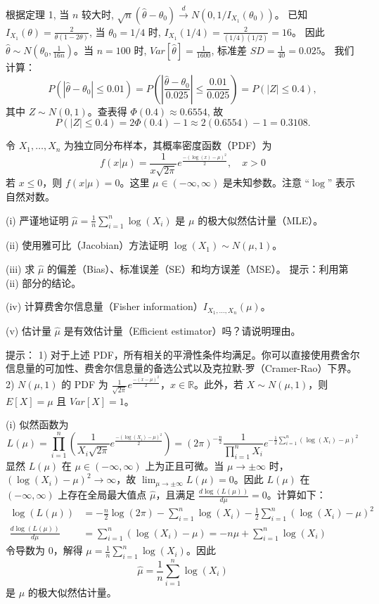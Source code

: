 \begin{questions}
\begin{parts}
\begin{solution}
根据定理 1, 当 $n$ 较大时, $\sqrt{n}(\hat{\theta} - \theta_0) \xrightarrow{d} N(0, 1/I_{X_1}(\theta_0))$。
已知 $I_{X_1}(\theta) = \frac{2}{\theta(1 - 2\theta)}$, 当 $\theta_0 = 1/4$ 时, $I_{X_1}(1/4) = \frac{2}{(1/4)(1/2)} = 16$。
因此 $\hat{\theta} \sim N(\theta_0, \frac{1}{16n})$。当 $n = 100$ 时, $Var[\hat{\theta}] = \frac{1}{1600}$, 标准差 $SD = \frac{1}{40} = 0.025$。
我们计算：
\[
P(|\hat{\theta} - \theta_0| \le 0.01) = P\left( \left| \frac{\hat{\theta} - \theta_0}{0.025} \right| \le \frac{0.01}{0.025} \right) = P(|Z| \le 0.4),
\]
其中 $Z \sim N(0, 1)$。查表得 $\Phi(0.4) \approx 0.6554$, 故
\[
P(|Z| \le 0.4) = 2\Phi(0.4) - 1 \approx 2(0.6554) - 1 = 0.3108.
\]
\end{solution}
\end{parts}

\question
令 $X_1, \ldots, X_n$ 为独立同分布样本，其概率密度函数（PDF）为
\[
f(x|\mu) = \frac{1}{x\sqrt{2\pi}} e^{\frac{-(\log(x)-\mu)^2}{2}}, \quad x > 0
\]
若 $x \le 0$，则 $f(x|\mu) = 0$。这里 $\mu \in (-\infty, \infty)$ 是未知参数。注意 “$\log$” 表示自然对数。

(i) 严谨地证明 $\hat{\mu} = \frac{1}{n} \sum_{i=1}^n \log(X_i)$ 是 $\mu$ 的极大似然估计量（MLE）。

(ii) 使用雅可比（Jacobian）方法证明 $\log(X_1) \sim N(\mu, 1)$。

(iii) 求 $\hat{\mu}$ 的偏差（Bias）、标准误差（SE）和均方误差（MSE）。
提示：利用第 (ii) 部分的结论。

(iv) 计算费舍尔信息量（Fisher information）$I_{X_1, \ldots, X_n}(\mu)$。

(v) 估计量 $\hat{\mu}$ 是有效估计量（Efficient estimator）吗？请说明理由。

提示：
1) 对于上述 PDF，所有相关的平滑性条件均满足。你可以直接使用费舍尔信息量的可加性、费舍尔信息量的备选公式以及克拉默-罗（Cramer-Rao）下界。
2) $N(\mu, 1)$ 的 PDF 为 $\frac{1}{\sqrt{2\pi}} e^{\frac{-(x-\mu)^2}{2}}$，$x \in \mathbb{R}$。此外，若 $X \sim N(\mu, 1)$，则 $E[X] = \mu$ 且 $Var[X] = 1$。

\begin{solution}
(i) 似然函数为
\[
L(\mu) = \prod_{i=1}^n \left( \frac{1}{X_i\sqrt{2\pi}} e^{\frac{-(\log(X_i)-\mu)^2}{2}} \right) = (2\pi)^{-\frac{n}{2}} \frac{1}{\prod_{i=1}^n X_i} e^{-\frac{1}{2} \sum_{i=1}^n (\log(X_i)-\mu)^2}
\]
显然 $L(\mu)$ 在 $\mu \in (-\infty, \infty)$ 上为正且可微。当 $\mu \to \pm \infty$ 时，$(\log(X_i)-\mu)^2 \to \infty$，故 $\lim_{\mu \to \pm \infty} L(\mu) = 0$。因此 $L(\mu)$ 在 $(-\infty, \infty)$ 上存在全局最大值点 $\hat{\mu}$，且满足 $\frac{d \log(L(\mu))}{d\mu} = 0$。计算如下：
\begin{align*}
\log(L(\mu)) &= -\frac{n}{2} \log(2\pi) - \sum_{i=1}^n \log(X_i) - \frac{1}{2} \sum_{i=1}^n (\log(X_i)-\mu)^2 \\
\frac{d \log(L(\mu))}{d\mu} &= \sum_{i=1}^n (\log(X_i) - \mu) = -n\mu + \sum_{i=1}^n \log(X_i)
\end{align*}
令导数为 0，解得 $\mu = \frac{1}{n} \sum_{i=1}^n \log(X_i)$。因此
\[
\hat{\mu} = \frac{1}{n} \sum_{i=1}^n \log(X_i)
\]
是 $\mu$ 的极大似然估计量。


\end{solution}
\end{questions}
